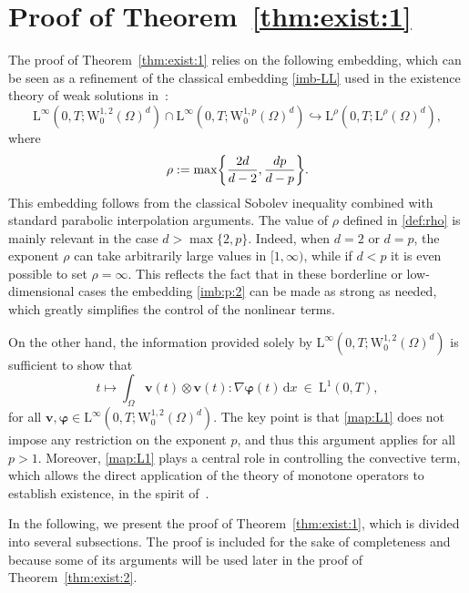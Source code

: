 \documentclass[12pt,reqno]{amsart}
\numberwithin{equation}{section}
\let\originalleft\left
\let\originalright\right
\renewcommand{\left}{\mathopen{}\mathclose\bgroup\originalleft}
\renewcommand{\right}{\aftergroup\egroup\originalright}
\theoremstyle{definition}
\def\W{\mathrm{W}}
\def\L{\mathrm{L}}
\begin{document}
\section{Proof of Theorem~\ref{thm:exist:1}}\label{Sect:ex:thm:1}

{
The proof of Theorem~\ref{thm:exist:1} relies on the following embedding, which can be seen as a refinement of the classical embedding \eqref{imb-LL} used in the existence theory of weak solutions in~\cite{Lions:1969}:
\begin{equation}\label{imb:p:2}
\L^\infty(0,T; \W^{1,2}_0(\Omega)^d)
\cap
\L^\infty(0,T; \W^{1,p}_0(\Omega)^d)
\hookrightarrow
\L^{\rho}(0,T; \L^{\rho}(\Omega)^d),
\end{equation}
where
\begin{equation}\label{def:rho}
\rho := \max\left\{\frac{2d}{d-2},\frac{dp}{d-p}\right\}.
\end{equation}
This embedding follows from the classical Sobolev inequality combined with standard parabolic interpolation arguments.
The value of $\rho$ defined in \eqref{def:rho} is mainly relevant in the case $d>\max\{2,p\}$.
Indeed, when $d=2$ or $d=p$, the exponent $\rho$ can take arbitrarily large values in $[1,\infty)$, while if $d<p$ it is even possible to set $\rho = \infty$.
This reflects the fact that in these borderline or low-dimensional cases the embedding \eqref{imb:p:2} can be made as strong as needed, which greatly simplifies the control of the nonlinear terms.

On the other hand, the information provided solely by
$\L^\infty(0,T; \W^{1,2}_0(\Omega)^d)$ is sufficient to show that
\begin{equation}\label{map:L1}
t
\longmapsto
\int_\Omega
\boldsymbol{v}(t) \otimes \boldsymbol{v}(t)
:
\nabla \boldsymbol{\varphi}(t) \, \mathrm{d}x
\ \in \ \L^1(0,T),
\end{equation}
for all
$\boldsymbol{v},\boldsymbol{\varphi} \in \L^\infty(0,T; \W^{1,2}_0(\Omega)^d)$.
The key point is that \eqref{map:L1} does not impose any restriction on the exponent $p$, and thus this argument applies for all $p>1$.
Moreover, \eqref{map:L1} plays a central role in controlling the convective term, which allows the direct application of the theory of monotone operators to establish existence, in the spirit of~\cite{Ladyzhenskaya1969,Lions:1969}.
}


{
In the following, we present the proof of Theorem~\ref{thm:exist:1}, which is divided into several subsections. The proof is included for the sake of completeness and because some of its arguments will be used later in the proof of Theorem~\ref{thm:exist:2}.
}
\end{document}
